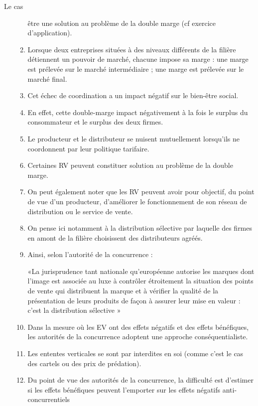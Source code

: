 \begin{frame}[allowframebreaks]{Le cas}
\begin{enumerate}[(a)]
\begin{enumerate}[$\star$]
 être une solution au problème de la double marge (cf exercice d’application).
 \item Lorsque deux entreprises situées à des niveaux différents de la filière détiennent 
 un pouvoir de marché, chacune impose sa marge : une marge est prélevée sur le marché intermédiaire ; une marge est prélevée sur le marché final.
 \item Cet échec de coordination a un impact négatif sur le bien-être social.
 \item En effet, cette double-marge impact négativement à la fois le surplus du 
 consommateur et le surplus des deux firmes.
 \item Le producteur et le distributeur se nuisent mutuellement lorsqu’ils ne 
 coordonnent par leur politique tarifaire.
 \item Certaines RV peuvent constituer solution au problème de la double marge. 
 \item On peut également noter que les RV peuvent avoir pour objectif, du point de vue d’un producteur, d’améliorer le fonctionnement 
 de son réseau de distribution ou le service de vente. 
 \item On pense ici notamment à la distribution sélective par
  laquelle des firmes en amont de la filière choisissent des distributeurs agréés.
  \item Ainsi, selon l’autorité de la concurrence :
  \begin{mdframed}
  «La jurisprudence tant nationale qu'européenne autorise les marques dont l'image 
  est associée au luxe à contrôler étroitement la situation 
  des points de vente qui distribuent la marque et à vérifier 
  la qualité de la présentation de leurs produits de façon à assurer leur mise en
   valeur : c'est la distribution sélective »
  \end{mdframed}
  \item Dans la mesure où les EV ont des effets négatifs et des effets bénéfiques, les autorités
   de la concurrence adoptent une approche conséquentialiste.
  \item  Les ententes verticales se sont par interdites en soi (comme c’est le cas des cartels
   ou des prix de prédation).
  \item Du point de vue des autorités de la concurrence, la difficulté est d’estimer si les effets
   bénéfiques peuvent l’emporter sur les effets négatifs anti-concurrentiels
  \end{enumerate}


\end{enumerate}
\end{frame}

